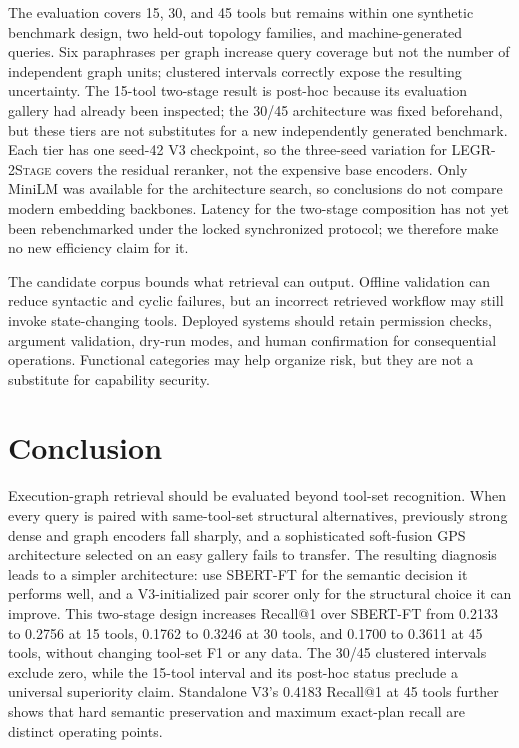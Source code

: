\documentclass{article}
\newcommand{\method}{\textsc{LEGR-2Stage}}
\newcommand{\sbert}{\textsc{SBERT-FT}}
\begin{document}
The evaluation covers 15, 30, and 45 tools but remains within one synthetic benchmark design, two held-out topology families, and machine-generated queries.
Six paraphrases per graph increase query coverage but not the number of independent graph units; clustered intervals correctly expose the resulting uncertainty.
The 15-tool two-stage result is post-hoc because its evaluation gallery had already been inspected; the 30/45 architecture was fixed beforehand, but these tiers are not substitutes for a new independently generated benchmark.
Each tier has one seed-42 V3 checkpoint, so the three-seed variation for \method{} covers the residual reranker, not the expensive base encoders.
Only MiniLM was available for the architecture search, so conclusions do not compare modern embedding backbones.
Latency for the two-stage composition has not yet been rebenchmarked under the locked synchronized protocol; we therefore make no new efficiency claim for it.

The candidate corpus bounds what retrieval can output.
Offline validation can reduce syntactic and cyclic failures, but an incorrect retrieved workflow may still invoke state-changing tools.
Deployed systems should retain permission checks, argument validation, dry-run modes, and human confirmation for consequential operations.
Functional categories may help organize risk, but they are not a substitute for capability security.

\section{Conclusion}

Execution-graph retrieval should be evaluated beyond tool-set recognition.
When every query is paired with same-tool-set structural alternatives, previously strong dense and graph encoders fall sharply, and a sophisticated soft-fusion GPS architecture selected on an easy gallery fails to transfer.
The resulting diagnosis leads to a simpler architecture: use \sbert{} for the semantic decision it performs well, and a V3-initialized pair scorer only for the structural choice it can improve.
This two-stage design increases Recall@1 over \sbert{} from 0.2133 to 0.2756 at 15 tools, 0.1762 to 0.3246 at 30 tools, and 0.1700 to 0.3611 at 45 tools, without changing tool-set F1 or any data.
The 30/45 clustered intervals exclude zero, while the 15-tool interval and its post-hoc status preclude a universal superiority claim.
Standalone V3's 0.4183 Recall@1 at 45 tools further shows that hard semantic preservation and maximum exact-plan recall are distinct operating points.
\end{document}
